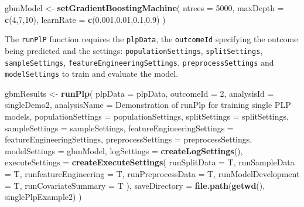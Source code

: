 \documentclass[
]{article}
\newenvironment{Shaded}{\begin{snugshade}}{\end{snugshade}}
\newcommand{\AttributeTok}[1]{\textcolor[rgb]{0.13,0.29,0.53}{#1}}
\newcommand{\DecValTok}[1]{\textcolor[rgb]{0.00,0.00,0.81}{#1}}
\newcommand{\FloatTok}[1]{\textcolor[rgb]{0.00,0.00,0.81}{#1}}
\newcommand{\FunctionTok}[1]{\textcolor[rgb]{0.13,0.29,0.53}{\textbf{#1}}}
\newcommand{\NormalTok}[1]{#1}
\newcommand{\OtherTok}[1]{\textcolor[rgb]{0.56,0.35,0.01}{#1}}
\newcommand{\StringTok}[1]{\textcolor[rgb]{0.31,0.60,0.02}{#1}}
\begin{document}
\begin{Shaded}
\begin{Highlighting}[]
\NormalTok{    gbmModel }\OtherTok{\textless{}{-}} \FunctionTok{setGradientBoostingMachine}\NormalTok{(}
      \AttributeTok{ntrees =} \DecValTok{5000}\NormalTok{, }
      \AttributeTok{maxDepth =} \FunctionTok{c}\NormalTok{(}\DecValTok{4}\NormalTok{,}\DecValTok{7}\NormalTok{,}\DecValTok{10}\NormalTok{), }
      \AttributeTok{learnRate =} \FunctionTok{c}\NormalTok{(}\FloatTok{0.001}\NormalTok{,}\FloatTok{0.01}\NormalTok{,}\FloatTok{0.1}\NormalTok{,}\FloatTok{0.9}\NormalTok{)}
\NormalTok{      )}
\end{Highlighting}
\end{Shaded}

The \texttt{runPlP} function requires the \texttt{plpData}, the
\texttt{outcomeId} specifying the outcome being predicted and the
settings: \texttt{populationSettings}, \texttt{splitSettings},
\texttt{sampleSettings}, \texttt{featureEngineeringSettings},
\texttt{preprocessSettings} and \texttt{modelSettings} to train and
evaluate the model.

\begin{Shaded}
\begin{Highlighting}[]
\NormalTok{  gbmResults }\OtherTok{\textless{}{-}} \FunctionTok{runPlp}\NormalTok{(}
    \AttributeTok{plpData =}\NormalTok{ plpData,}
    \AttributeTok{outcomeId =} \DecValTok{2}\NormalTok{, }
    \AttributeTok{analysisId =} \StringTok{\textquotesingle{}singleDemo2\textquotesingle{}}\NormalTok{,}
    \AttributeTok{analysisName =} \StringTok{\textquotesingle{}Demonstration of runPlp for training single PLP models\textquotesingle{}}\NormalTok{,}
    \AttributeTok{populationSettings =}\NormalTok{ populationSettings, }
    \AttributeTok{splitSettings =}\NormalTok{ splitSettings,}
    \AttributeTok{sampleSettings =}\NormalTok{ sampleSettings, }
    \AttributeTok{featureEngineeringSettings =}\NormalTok{ featureEngineeringSettings, }
    \AttributeTok{preprocessSettings =}\NormalTok{ preprocessSettings,}
    \AttributeTok{modelSettings =}\NormalTok{ gbmModel,}
    \AttributeTok{logSettings =} \FunctionTok{createLogSettings}\NormalTok{(), }
    \AttributeTok{executeSettings =} \FunctionTok{createExecuteSettings}\NormalTok{(}
      \AttributeTok{runSplitData =}\NormalTok{ T, }
      \AttributeTok{runSampleData =}\NormalTok{ T, }
      \AttributeTok{runfeatureEngineering =}\NormalTok{ T, }
      \AttributeTok{runPreprocessData =}\NormalTok{ T, }
      \AttributeTok{runModelDevelopment =}\NormalTok{ T, }
      \AttributeTok{runCovariateSummary =}\NormalTok{ T}
\NormalTok{    ), }
    \AttributeTok{saveDirectory =} \FunctionTok{file.path}\NormalTok{(}\FunctionTok{getwd}\NormalTok{(), }\StringTok{\textquotesingle{}singlePlpExample2\textquotesingle{}}\NormalTok{)}
\NormalTok{    )}
\end{Highlighting}
\end{Shaded}
\end{document}
